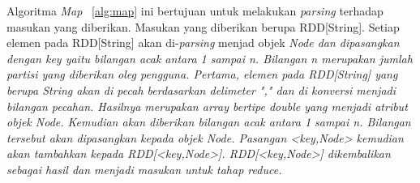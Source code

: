 \clearpage

\begin{algorithm}[H]
	\label{alg:patern}
	\DontPrintSemicolon\SetAlgoNoLine\LinesNumbered
	
\end{algorithm}
 
Algoritma \textit{Map} ~\ref{alg:map} ini bertujuan untuk melakukan \textit{parsing} terhadap masukan yang diberikan. Masukan yang diberikan berupa RDD[String]. Setiap elemen pada RDD[String] akan di-\textit{parsing} menjad objek \it{Node} dan dipasangkan dengan \it{key} yaitu bilangan acak antara 1 sampai n. Bilangan n merupakan jumlah partisi yang diberikan oleg pengguna. Pertama, elemen pada RDD[String] yang berupa \textit{String} akan di pecah berdasarkan \textit{delimeter} "," dan di konversi menjadi bilangan pecahan. Hasilnya merupakan \textit{array} bertipe \textit{double} yang menjadi atribut objek \textit{Node}. Kemudian akan diberikan bilangan acak antara 1 sampai n. Bilangan tersebut akan dipasangkan kepada objek \it{Node}. Pasangan <\it{key},\textit{Node}> kemudian akan tambahkan kepada RDD[<\it{key},\it{Node}>]. RDD[<\it{key},\it{Node}>] dikembalikan sebagai hasil dan menjadi masukan untuk tahap \textit{reduce}.\\

